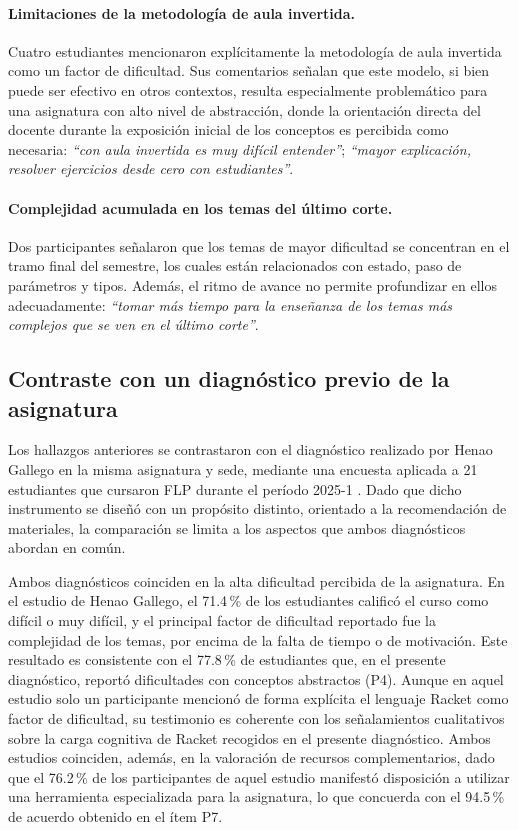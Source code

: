 \paragraph{Limitaciones de la metodología de aula invertida.}
Cuatro estudiantes mencionaron explícitamente la metodología de aula invertida como un factor de dificultad. Sus comentarios señalan que este modelo, si bien puede ser efectivo en otros contextos, resulta especialmente problemático para una asignatura con alto nivel de abstracción, donde la orientación directa del docente durante la exposición inicial de los conceptos es percibida como necesaria: \textit{``con aula invertida es muy difícil entender''}; \textit{``mayor explicación, resolver ejercicios desde cero con estudiantes''}.

\paragraph{Complejidad acumulada en los temas del último corte.}
Dos participantes señalaron que los temas de mayor dificultad se concentran en el tramo final del semestre, los cuales están relacionados con estado, paso de parámetros y tipos. Además, el ritmo de avance no permite profundizar en ellos adecuadamente: \textit{``tomar más tiempo para la enseñanza de los temas más complejos que se ven en el último corte''}.

\subsection{Contraste con un diagnóstico previo de la asignatura}

Los hallazgos anteriores se contrastaron con el diagnóstico realizado por Henao Gallego en la misma asignatura y sede, mediante una encuesta aplicada a 21 estudiantes que cursaron FLP durante el período 2025-1 \cite{henao2026recomendacion}. Dado que dicho instrumento se diseñó con un propósito distinto, orientado a la recomendación de materiales, la comparación se limita a los aspectos que ambos diagnósticos abordan en común.

Ambos diagnósticos coinciden en la alta dificultad percibida de la asignatura. En el estudio de Henao Gallego, el 71.4\,\% de los estudiantes calificó el curso como difícil o muy difícil, y el principal factor de dificultad reportado fue la complejidad de los temas, por encima de la falta de tiempo o de motivación. Este resultado es consistente con el 77.8\,\% de estudiantes que, en el presente diagnóstico, reportó dificultades con conceptos abstractos (P4). Aunque en aquel estudio solo un participante mencionó de forma explícita el lenguaje Racket como factor de dificultad, su testimonio es coherente con los señalamientos cualitativos sobre la carga cognitiva de Racket recogidos en el presente diagnóstico. Ambos estudios coinciden, además, en la valoración de recursos complementarios, dado que el 76.2\,\% de los participantes de aquel estudio manifestó disposición a utilizar una herramienta especializada para la asignatura, lo que concuerda con el 94.5\,\% de acuerdo obtenido en el ítem P7.

